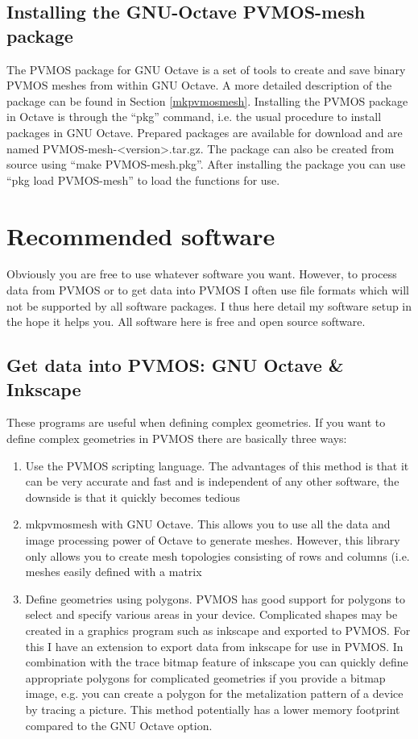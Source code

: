 \documentclass[noshowpacs,preprintnumbers,amsmath,amssymb, letter]{revtex4}
\begin{document}
\subsection{Installing the GNU-Octave PVMOS-mesh package}
The PVMOS package for GNU Octave is a set of tools to create and save binary PVMOS meshes from within GNU Octave. A more detailed description of the package can be found in Section \ref{mkpvmosmesh}. Installing the PVMOS package in Octave is through the ``pkg'' command, i.e. the usual procedure to install packages in GNU Octave. Prepared packages are available for download and are named PVMOS-mesh-<version>.tar.gz. The package can also be created from source using ``make PVMOS-mesh.pkg''. After installing the package you can use ``pkg load PVMOS-mesh'' to load the functions for use.

\section{Recommended software}
Obviously you are free to use whatever software you want. However, to process data from PVMOS or to get data into PVMOS I often use file formats which will not be supported by all software packages. I thus here detail my software setup in the hope it helps you. All software here is free and open source software.

\subsection{Get data into PVMOS: GNU Octave \& Inkscape}
These programs are useful when defining complex geometries. If you want to define complex geometries in PVMOS there are basically three ways:
\begin{enumerate}
\item{} Use the PVMOS scripting language. The advantages of this method is that it can be very accurate and fast and is independent of any other software, the downside is that it quickly becomes tedious
\item{} mkpvmosmesh with GNU Octave. This allows you to use all the data and image processing power of Octave to generate meshes. However, this library only allows you to create mesh topologies consisting of rows and columns (i.e. meshes easily defined with a matrix
\item{} Define geometries using polygons. PVMOS has good support for polygons to select and specify various areas in your device. Complicated shapes may be created in a graphics program such as inkscape and exported to PVMOS. For this I have an extension to export data from inkscape for use in PVMOS. In combination with the trace bitmap feature of inkscape you can quickly define appropriate polygons for complicated geometries if you provide a bitmap image, e.g. you can create a polygon for the metalization pattern of a device by tracing a picture. This method potentially has a lower memory footprint compared to the GNU Octave option. 
\end{enumerate}   
\end{document}
